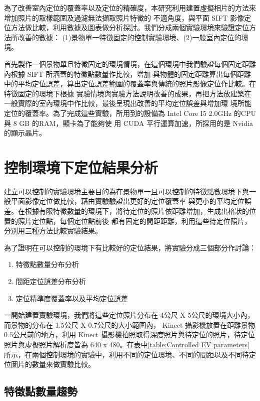 %
	為了改善室內定位的覆蓋率以及定位的精確度，本研究利用建置虛擬相片的方法來增加照片的取樣範圍及過濾無法擷取照片特徵的
不適角度，與平面 SIFT 影像定位方法做比較，利用數據及圖表做分析探討。我們分成兩個實驗環境來驗證定位方法所改善的數據：
(1)景物單一特徵固定的控制實驗環境、(2)一般室內定位的環境。

	首先製作一個景物單且特徵固定的環境情境，在這個環境中我們驗證每個固定距離內根據 SIFT 所涵蓋的特徵點數量作比較，增加
與物體的固定距離算出每個距離中的平均定位誤差，算出定位誤差範圍的覆蓋率與傳統的照片影像定位作比較。在特徵固定的環境下根據
實驗情境與實驗方法說明改善的成果，再把方法放建築在一般實際的室內環境中作比較，最後呈現出改善的平均定位誤差與增加環
境所能定位的覆蓋率。為了完成這些實驗，所用到的設備為  Intel Core I5 2.0GHz 的CPU與 8 GB 的RAM，顯卡為了能夠使
用 CUDA 平行運算加速，所採用的是 Nvidia 的顯示晶片。

\section{控制環境下定位結果分析}

	建立可以控制的實驗環境主要目的為在景物單一且可以控制的特徵點數環境下與一般平面影像定位做比較，藉由實驗驗證出更好的定位覆蓋率
與更小的平均定位誤差。在根據有限特徵數量的環境下，將待定位的照片依距離增加，生成出格狀的位置的照片定位點，每個定位點前後
都有固定的間距距離，利用這些待定位照片，分別用三種方法比較實驗結果。
						
	為了證明在可以控制的環境下有比較好的定位結果，將實驗分成三個部分作討論：
	
\begin{enumerate}
  \item 特徵點數量分布分析
  \item 間距定位誤差分布分析
  \item 定位精準度覆蓋率以及平均定位誤差
\end{enumerate}



	一開始建置實驗環境，我們將這些定位照片分布在 4公尺 X 5公尺的環境大小內，而景物的分布在 1.5公尺 X 0.7公尺的大小範圍內， 
Kinect 攝影機放置在距離景物 0.5公尺前的地方，利用 Kinect 攝影機拍照取得深度照片與待定位的照片，待定位照片與虛擬照片解析度皆為
640 x 480。在表中\ref{table:Controlled EV parameters}所示，在兩個控制環境的實驗中，利用不同的定位環境、不同的間距以及不同待定位圖片的數量來做實驗比較。
		
\subsection{特徵點數量趨勢}

